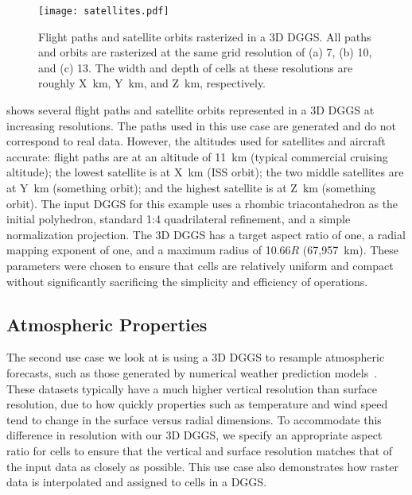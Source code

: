 \begin{figure}[ht!]
	\centering
	\texttt{[image: satellites.pdf]}
	\caption[Flight path and satellite orbit use case showing several sample trajectories]{
		Flight paths and satellite orbits rasterized in a 3D DGGS.
		All paths and orbits are rasterized at the same grid resolution of (a) 7, (b) 10, and (c) 13.
		The width and depth of cells at these resolutions are roughly X~km, Y~km, and Z~km, respectively.
	}
	\label{fig:satellites}
\end{figure}


 shows several flight paths and satellite orbits represented in a 3D DGGS at increasing resolutions.
The paths used in this use case are generated and do not correspond to real data.
However, the altitudes used for satellites and aircraft  accurate:
flight paths are at an altitude of 11~km (typical commercial cruising altitude); the lowest satellite is at X~km (ISS orbit); the two middle satellites are at Y~km (something orbit); and the highest satellite is at Z~km (something orbit).  
The input DGGS for this example uses a rhombic triacontahedron as the initial polyhedron, standard 1:4 quadrilateral refinement, and a simple normalization projection.
The 3D DGGS has a target aspect ratio of one, a radial mapping exponent of one, and a maximum radius of 10.66$R$ (67,957~km).
These parameters were chosen to ensure that cells are relatively uniform and compact without significantly sacrificing the simplicity and efficiency of operations.


\subsection{Atmospheric Properties} \label{chap:8:atmo}
The second use case we look at is using a 3D DGGS to resample atmospheric forecasts, such as those generated by numerical weather prediction models~\cite{ncepncar, era5}.
These datasets typically have a much higher vertical resolution than surface resolution, due to how quickly properties such as temperature and wind speed tend to change in the surface versus radial dimensions.
To accommodate this difference in resolution with our 3D DGGS, we specify an appropriate aspect ratio for cells to ensure that the vertical and surface resolution matches that of the input data as closely as possible.
This use case also demonstrates how raster data is interpolated and assigned to cells in a DGGS. 


